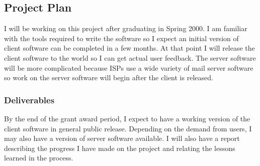 
\subsection{Project Plan}
I will be working on this project after graduating in Spring 2000. I am
familiar with the tools required to write the software so I expect an initial
version of client software can be completed in a few months. At that point I
will release the client software to the world so I can get actual user
feedback. The server software will be more complicated because ISPs use a wide
variety of mail server software so work on the server software will begin after
the client is released.

\subsubsection{Deliverables}
By the end of the grant award period, I expect to have a working version of the
client software in general public release. Depending on the demand from users,
I may also have a version of server software available. I will also have a
report describing the progress I have made on the project and relating the
lessons learned in the process.

